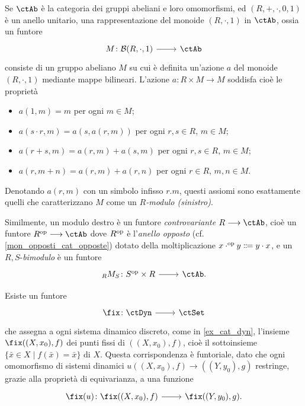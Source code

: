 \begin{example}
 Se \(\ctAb\) è la categoria dei gruppi abeliani e loro omomorfismi, ed \((R,+,\cdot,0,1)\) è un anello unitario, una rappresentazione del monoide \((R,\cdot,1)\) in \(\ctAb\), ossia un funtore
 \[\dmFun{M}{\susp(R,\cdot,1)}{\ctAb}\]
 consiste di un gruppo abeliano \(M\) su cui è definita un'azione \(a\) del monoide \((R,\cdot,1)\) mediante mappe bilineari. L'azione \(a \colon R\times M\to M\) soddisfa cioè le proprietà
 \begin{itemize}
  \item \(a(1,m)=m\) per ogni \(m\in M\);
  \item \(a(s\cdot r,m)=a(s,a(r,m))\) per ogni \(r,s\in R\), \(m\in M\);
  \item \(a(r+s,m) = a(r,m) + a(s,m)\) per ogni \(r,s\in R\), \(m\in M\);
  \item \(a(r,m+n) = a(r,m) + a(r,n)\) per ogni \(r\in R\), \(m,n\in M\).
 \end{itemize}
 Denotando \(a(r,m)\) con un simbolo infisso \(r.m\), questi assiomi sono esattamente quelli che caratterizzano \(M\) come un \emph{\(R\)-modulo (sinistro)}.

 Similmente, un modulo destro è un funtore \emph{controvariante} \(R\fun\ctAb\), cioè un funtore \(R^\op\fun\ctAb\) dove \(R^{\text{op}}\) è l'\emph{anello opposto} (cf. \ref{mon_opposti_cat_opposte}) dotato della moltiplicazione \(x\cdot^\op y \defeq y\cdot x\), e un \(R,S\)-\emph{bimodulo} è un funtore
 \[\dmFun{{}_RM_S}{S^\op\times R}{\ctAb.}\]
\end{example}
\begin{example}\label{ex_fun_fissi}
 Esiste un funtore
 \[\dmFun{\fix}{\ctDyn}{\ctSet}\]
 che assegna a ogni sistema dinamico discreto, come in \ref{ex_cat_dyn}, l'insieme \(\fix((X,x_0),f)\) dei punti fissi di \(((X,x_0),f)\), cioè il sottoinsieme \(\{\bar x\in X\mid f(\bar x)=\bar x\}\) di \(X\). Questa corrispondenza è funtoriale, dato che ogni omomorfismo di sistemi dinamici \(u ((X,x_0),f) \to ((Y,y_0),g)\) restringe, grazie alla proprietà di equivarianza, a una funzione
 \[\dmFun{\fix(u)}{\fix((X,x_0),f)}{\fix((Y,y_0),g).}\]
\end{example}
